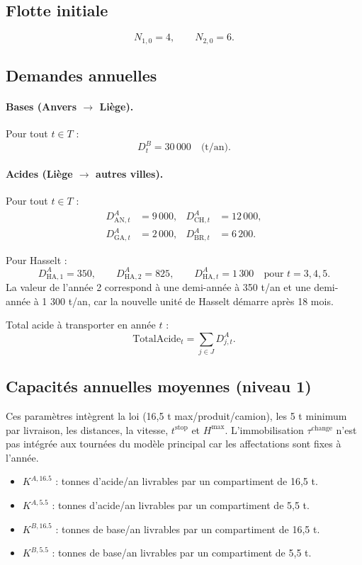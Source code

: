 \documentclass{article}
\begin{document}
\subsection{Flotte initiale}

\[
  N_{1,0} = 4, \qquad N_{2,0} = 6.
\]

\subsection{Demandes annuelles}

\paragraph{Bases (Anvers $\rightarrow$ Liège).}

Pour tout $t \in T$ :
\[
  D^{B}_t = 30\,000 \quad \text{(t/an)}.
\]

\paragraph{Acides (Liège $\rightarrow$ autres villes).}

Pour tout $t \in T$ :
\begin{align*}
  D^{A}_{\mathrm{AN},t} &= 9\,000, &
  D^{A}_{\mathrm{CH},t} &= 12\,000, \\
  D^{A}_{\mathrm{GA},t} &= 2\,000, &
  D^{A}_{\mathrm{BR},t} &= 6\,200.
\end{align*}

Pour Hasselt :
\[
  D^{A}_{\mathrm{HA},1} = 350, \qquad
  D^{A}_{\mathrm{HA},2} = 825, \qquad
  D^{A}_{\mathrm{HA},t} = 1\,300 \quad \text{pour } t=3,4,5.
\]
La valeur de l'année 2 correspond à une demi-année à 350 t/an et une demi-année
à 1 300 t/an, car la nouvelle unité de Hasselt démarre après 18 mois.

Total acide à transporter en année $t$ :
\[
  \text{TotalAcide}_t = \sum_{j \in J} D^{A}_{j,t}.
\]

\subsection{Capacités annuelles moyennes (niveau 1)}

Ces paramètres intègrent la loi (16,5 t max/produit/camion), les 5 t minimum par livraison,
les distances, la vitesse, $t^{\text{stop}}$ et $H^{\max}$. L'immobilisation
$\tau^{\text{change}}$ n'est pas intégrée aux tournées du modèle principal car
les affectations sont fixes à l'année.

\begin{itemize}
  \item $K^{A,16.5}$ : tonnes d'acide/an livrables par un compartiment de 16{,}5 t.
  \item $K^{A,5.5}$ : tonnes d'acide/an livrables par un compartiment de 5{,}5 t.
  \item $K^{B,16.5}$ : tonnes de base/an livrables par un compartiment de 16{,}5 t.
  \item $K^{B,5.5}$ : tonnes de base/an livrables par un compartiment de 5{,}5 t.
\end{itemize}
\end{document}
